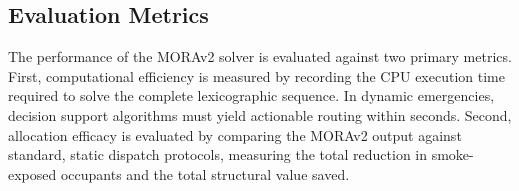 \subsection{Evaluation Metrics}
The performance of the MORAv2 solver is evaluated against two primary metrics. 
First, computational efficiency is measured by recording the CPU execution time required to solve the complete lexicographic sequence. In dynamic emergencies, decision support algorithms must yield actionable routing within seconds. 
Second, allocation efficacy is evaluated by comparing the MORAv2 output against standard, static dispatch protocols, measuring the total reduction in smoke-exposed occupants and the total structural value saved.